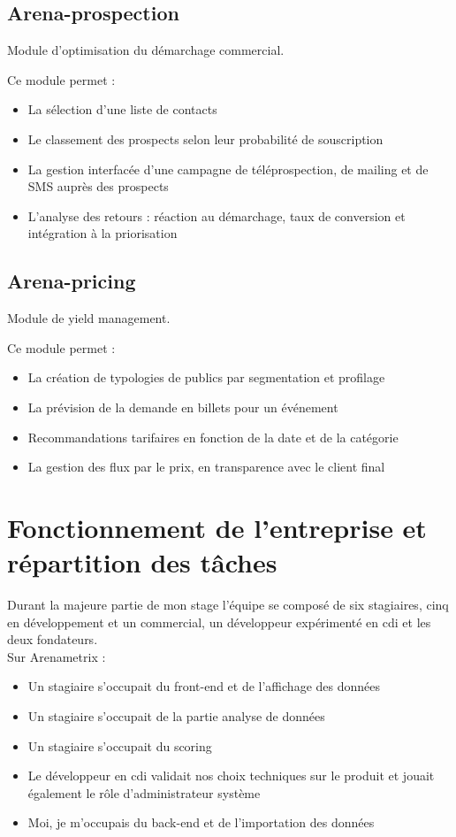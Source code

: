 \subsection{Arena-prospection}
Module d’optimisation du démarchage commercial.

Ce module permet :
\begin{itemize}
  \item[\textbullet] La sélection d’une liste de contacts
  \item[\textbullet] Le classement des prospects selon leur probabilité de souscription
  \item[\textbullet] La gestion interfacée d’une campagne de téléprospection, de mailing et de SMS auprès des prospects
  \item[\textbullet] L'analyse des retours : réaction au démarchage, taux de conversion et intégration à la priorisation
\end{itemize}

\subsection{Arena-pricing}
Module de yield management.

Ce module permet :
\begin{itemize}
  \item[\textbullet] La création de typologies de publics par segmentation et profilage
  \item[\textbullet] La prévision de la demande en billets pour un événement
  \item[\textbullet] Recommandations tarifaires en fonction de la date et de la catégorie
  \item[\textbullet] La gestion des flux par le prix, en transparence avec le client final
\end{itemize}

\section{Fonctionnement de l'entreprise et répartition des tâches}
Durant la majeure partie de mon stage l'équipe se composé de six stagiaires, cinq en développement et un commercial, un développeur expérimenté en cdi et les deux fondateurs. \\

Sur Arenametrix : 
\begin{itemize}
  \item[\textbullet] Un stagiaire s'occupait du front-end et de l'affichage des données
  \item[\textbullet] Un stagiaire s'occupait de la partie analyse de données
  \item[\textbullet] Un stagiaire s'occupait du scoring
  \item[\textbullet] Le développeur en cdi validait nos choix techniques sur le produit et jouait également le rôle d'administrateur système
  \item[\textbullet]Moi, je m'occupais du back-end et de l'importation des données
\end{itemize} \


